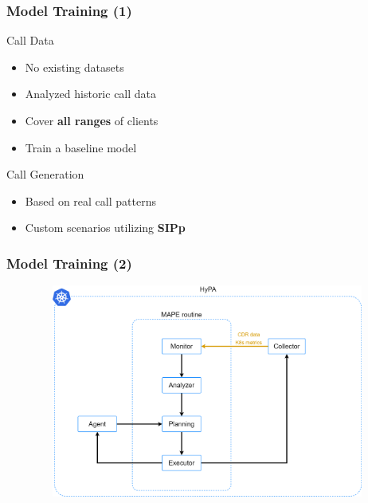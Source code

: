 \documentclass[11pt,t,usepdftitle=false,aspectratio=169]{beamer}
\begin{document}
\begin{frame}
	\frametitle{Model Training (1)}
	
	\begin{alertblock}{Call Data}
		\begin{itemize}
			\item No existing datasets
			\item Analyzed historic call data
			\item Cover \textbf{\color{red} all ranges} of clients
			\item Train a baseline model
		\end{itemize}
	\end{alertblock}
	
	\begin{block}{Call Generation}
		\begin{itemize}
			\item Based on real call patterns
			\item Custom scenarios utilizing \textbf{\color{uibkorange} SIPp}
		\end{itemize}
	\end{block}
\end{frame}

\begin{frame}
	\frametitle{Model Training (2)}
	
	\begin{figure}
		\centering
		\vspace*{-0.4cm}
		\includegraphics[width=12cm,height=7cm]{_images/trainings_model_1.png}
	\end{figure}
\end{frame}
\end{document}
